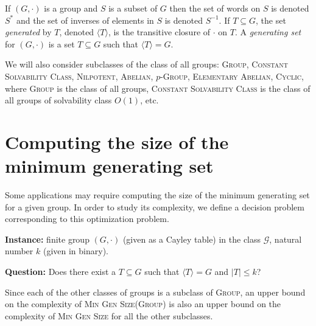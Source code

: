 \documentclass{article}
\newcommand{\gen}[1]{{\langle #1 \rangle}}
\begin{document}
If $(G, \cdot)$ is a group and $S$ is a subset of $G$ then the set of words on $S$ is denoted $S^*$ and the set of inverses of elements in $S$ is denoted $S^{-1}$.
If $T \subseteq G$, the set \emph{generated} by $T$, denoted $\gen{T}$, is the transitive closure of $\cdot$ on $T$.
A \emph{generating set} for $(G, \cdot)$ is a set $T \subseteq G$ such that $\gen{T} = G$.

We will also consider subclasses of the class of all groups: \textsc{Group}, \textsc{Constant Solvability Class}, \textsc{Nilpotent}, \textsc{Abelian}, \textsc{$p$-Group}, \textsc{Elementary Abelian}, \textsc{Cyclic}, where \textsc{Group} is the class of all groups, \textsc{Constant Solvability Class} is the class of all groups of solvability class $O(1)$, etc.

\section{Computing the size of the minimum generating set}

Some applications may require computing the size of the minimum generating set for a given group.
In order to study its complexity, we define a decision problem corresponding to this optimization problem.

\begin{definition}
  \mbox{}

  \textbf{Instance:} finite group $(G, \cdot)$ (given as a Cayley table) in the class $\mathcal{G}$, natural number $k$ (given in binary).

  \textbf{Question:} Does there exist a $T \subseteq G$ such that $\gen{T} = G$ and $|T| \leq k$?
\end{definition}

Since each of the other classes of groups is a subclass of \textsc{Group}, an upper bound on the complexity of \textsc{Min Gen Size(Group)} is also an upper bound on the complexity of \textsc{Min Gen Size} for all the other subclasses.

\end{document}
